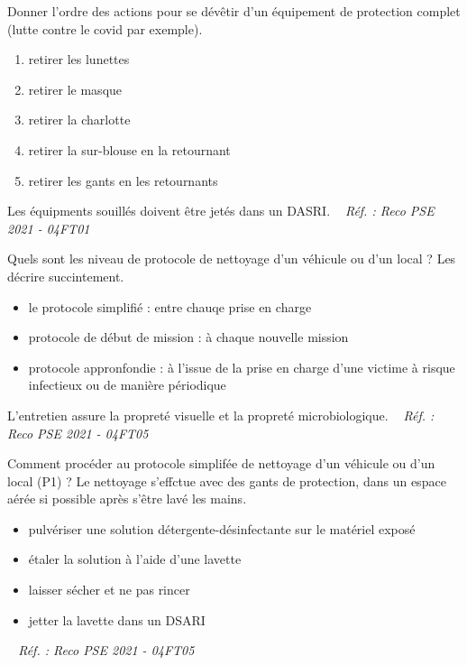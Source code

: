 \documentclass[grid,avery5371,landscape]{flashcards}
\makeatletter
\newcounter{nocarte}
\newcommand{\categ}[1]{%
  \def\@categ{#1}%
  \setcounter{nocarte}{0}%
}
\newcommand{\source}[1]{%
  \medskip
  \itshape%
   ~ \hfill Réf. : #1}
\makeatother
\begin{document}
\color[HTML]{003273}
\categ{PSE}
\begin{flashcard}[matériel]{
 Donner l'ordre des actions pour se dévêtir d'un équipement de protection complet (lutte contre le covid par exemple).   }
  \begin{enumerate} \item retirer les lunettes \item retirer le masque \item retirer la charlotte \item retirer la sur-blouse en la retournant \item retirer les gants en les retournants \end{enumerate} 
Les équipments souillés doivent être jetés dans un DASRI.
  \source{Reco PSE 2021 - 04FT01}
\end{flashcard}


\color[HTML]{003273}
\categ{PSE}
\begin{flashcard}[matériel]{
 Quels sont les niveau de protocole de nettoyage d'un véhicule ou d'un local ? Les décrire succintement.   }
  \begin{itemize} \item le protocole simplifié : entre chauqe prise en charge \item protocole de début de mission : à chaque nouvelle mission \item protocole appronfondie : à l'issue de la prise en charge d'une victime à risque infectieux ou de manière périodique \end{itemize}
 L'entretien assure la propreté visuelle et la propreté microbiologique.
  \source{Reco PSE 2021 - 04FT05}
\end{flashcard}


\color[HTML]{003273}
\categ{PSE}
\begin{flashcard}[matériel]{
 Comment procéder au protocole simplifée de nettoyage d'un véhicule ou d'un local (P1) ?   }
  Le nettoyage s'effctue avec des gants de protection, dans un espace aérée si possible après s'être lavé les mains. \\ \begin{itemize} \item pulvériser une solution détergente-désinfectante sur le matériel exposé \item étaler la solution à l'aide d'une lavette \item laisser sécher et ne pas rincer \item jetter la lavette dans un DSARI \end{itemize}
  \source{Reco PSE 2021 - 04FT05}
\end{flashcard}
\end{document}
